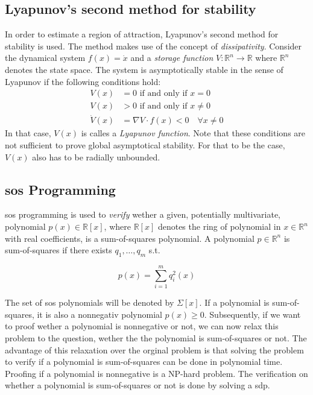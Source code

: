 \documentclass[10pt,a4paper]{article}
\begin{document}
\subsection{Lyapunov's second method for stability} 
In order to estimate a region of attraction, Lyapunov's second method for stability is used. The method makes use of the concept of \textit{dissipativity}.
Consider the dynamical system $f(x) = \dot{x}$ and a \textit{storage function} $V: \mathbb{R}^n \rightarrow \mathbb{R}$ where $\mathbb{R}^n$ denotes the state space.
The system is asymptotically stable in the sense of Lyapunov if the following conditions hold:
\begin{align}
	V(x) &= 0 \text{ if and only if } x=0\\
	V(x) &> 0 \text{ if and only if } x\neq0\\
	\dot{V}(x) &= \nabla V \cdot f(x) < 0 \quad \forall x \neq 0
\end{align}
In that case, $V(x)$ is calles a \textit{Lyapunov function}. Note that these conditions are not sufficient to prove global asymptotical stability.
For that to be the case, $V(x)$ also has to be radially unbounded.


\subsection{\gls{sos} Programming \cite{cunis_loureiro2023}}
\gls{sos} programming is used to \textit{verify} wether a given, potentially multivariate, polynomial $p(x) \in \mathbb{R}[x]$, where $\mathbb{R}[x]$ denotes
the ring of polynomial in $x \in \mathbb{R}^n$ with real coefficients, is a sum-of-squares polynomial. A polynomial $p \in \mathbb{R}^n$ is sum-of-squares if
there exists $q_1, \dots, q_m$ s.t.

\begin{equation}
	p(x)=\sum_{i=1}^m q_i^2(x)
\end{equation}

The set of \gls{sos} polynomials will be denoted by $\Sigma[x]$. If a polynomial is sum-of-squares, it is also a nonnegativ polynomial $p(x) \geq 0$.
Subsequently, if we want to proof wether a polynomial is nonnegative or not, we can now relax this problem to the question, wether the the polynomial
is sum-of-squares or not. The advantage of this relaxation over the orginal problem is that solving the problem to verify if a polynomial is 
sum-of-squares can be done in polynomial time. Proofing if a polynomial is nonnegative is a NP-hard problem. The verification on whether a polynomial
is sum-of-squares or not is done by solving a \gls{sdp}.\\
\end{document}
